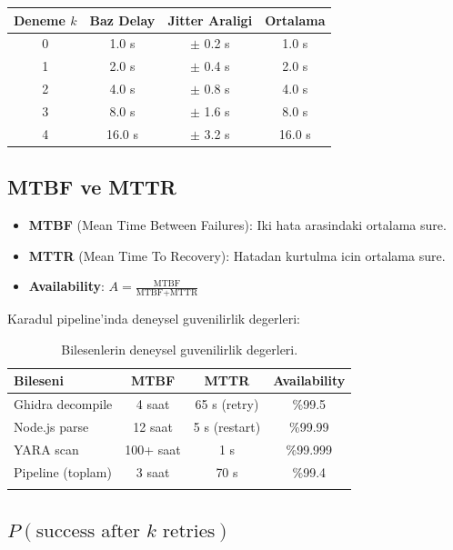 \begin{example}
\begin{longtable}{cccc}
\toprule
\textbf{Deneme $k$} & \textbf{Baz Delay} & \textbf{Jitter Araligi} & \textbf{Ortalama} \\
\midrule
0 & 1.0 s & $\pm$ 0.2 s & 1.0 s \\
1 & 2.0 s & $\pm$ 0.4 s & 2.0 s \\
2 & 4.0 s & $\pm$ 0.8 s & 4.0 s \\
3 & 8.0 s & $\pm$ 1.6 s & 8.0 s \\
4 & 16.0 s & $\pm$ 3.2 s & 16.0 s \\
\bottomrule
\end{longtable}
\end{example}

\subsection{MTBF ve MTTR}

\begin{tanim}
\begin{itemize}
  \item \textbf{MTBF} (Mean Time Between Failures): Iki hata arasindaki ortalama sure.
  \item \textbf{MTTR} (Mean Time To Recovery): Hatadan kurtulma icin ortalama sure.
  \item \textbf{Availability}: $A = \frac{\text{MTBF}}{\text{MTBF} + \text{MTTR}}$
\end{itemize}
\end{tanim}

Karadul pipeline'inda deneysel guvenilirlik degerleri:

\begin{longtable}{lccc}
\toprule
\textbf{Bileseni} & \textbf{MTBF} & \textbf{MTTR} & \textbf{Availability} \\
\midrule
\endhead
Ghidra decompile & 4 saat & 65 s (retry) & \%99.5 \\
Node.js parse & 12 saat & 5 s (restart) & \%99.99 \\
YARA scan & 100+ saat & 1 s & \%99.999 \\
Pipeline (toplam) & 3 saat & 70 s & \%99.4 \\
\bottomrule
\caption{Bilesenlerin deneysel guvenilirlik degerleri.}
\label{tab:mtbf-mttr}
\end{longtable}

\subsection{$P(\text{success after } k \text{ retries})$}

